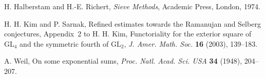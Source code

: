  H. Halberstam and H.-E. Richert,
\emph{Sieve Methods}, Academic Press, London, 1974.

 H. H. Kim and P. Sarnak,
Refined estimates towards the Ramanujan and Selberg conjectures,
Appendix~2 to H. H. Kim, Functoriality for the exterior square of
$\mathrm{GL}_4$ and the symmetric fourth of $\mathrm{GL}_2$,
\emph{J. Amer. Math. Soc.} \textbf{16} (2003), 139--183.

 A. Weil,
On some exponential sums,
\emph{Proc. Natl. Acad. Sci. USA} \textbf{34} (1948), 204--207.
